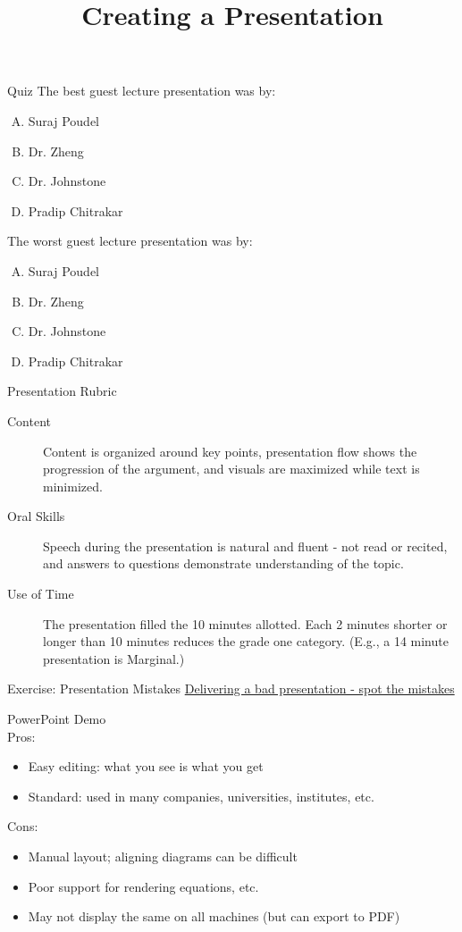 \documentclass{beamer}
\title{Creating a Presentation}
\date{}
\begin{document}
\begin{frame}
\titlepage
\end{frame}

\begin{frame}{Quiz}
The best guest lecture presentation was by:
\begin{enumerate}[(A)]
\item Suraj Poudel
\item Dr. Zheng
\item Dr. Johnstone
\item Pradip Chitrakar
\end{enumerate}
The worst guest lecture presentation was by:
\begin{enumerate}[(A)]
\item Suraj Poudel
\item Dr. Zheng
\item Dr. Johnstone
\item Pradip Chitrakar
\end{enumerate}
\end{frame}

\begin{frame}{Presentation Rubric}
\begin{description}
\item[Content] Content is organized around key points, presentation flow shows the progression of the argument, and visuals are maximized while text is minimized.
\item[Oral Skills] Speech during the presentation is natural and fluent - not read or recited, and answers to questions demonstrate understanding of the topic.
\item[Use of Time] The presentation filled the 10 minutes allotted. Each 2 minutes shorter or longer than 10 minutes reduces the grade one category. (E.g., a 14 minute presentation is Marginal.)
\end{description}
\end{frame}

\begin{frame}{Exercise: Presentation Mistakes}
\centering
\href{https://www.youtube.com/watch?v=ATfY8dvbuFg}{Delivering a bad presentation - spot the mistakes}
\end{frame}

\begin{frame}{PowerPoint}
Demo\\
\bigskip
Pros:
\begin{itemize}
\item Easy editing: what you see is what you get
\item Standard: used in many companies, universities, institutes, etc.
\end{itemize}
Cons:
\begin{itemize}
\item Manual layout; aligning diagrams can be difficult
\item Poor support for rendering equations, etc.
\item May not display the same on all machines (but can export to PDF)
\end{itemize}
\end{frame}
\end{document}
